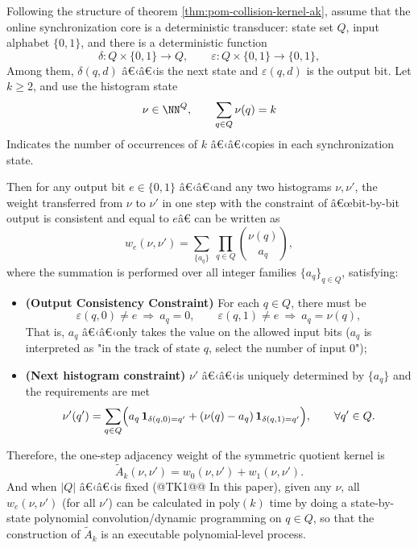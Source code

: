 \begin{proposition}\label{prop:pom-ak-symmetric-transition-poly}
Following the structure of theorem \ref{thm:pom-collision-kernel-ak}, assume that the online synchronization core is a deterministic transducer: state set $Q$, input alphabet $\{0,1\}$, and there is a deterministic function
$$
\delta:Q\times\{0,1\}\to Q,\qquad \varepsilon:Q\times\{0,1\}\to\{0,1\},
$$
Among them, $\delta(q,d)$ â€‹â€‹is the next state and $\varepsilon(q,d)$ is the output bit. Let $k\ge 2$, and use the histogram state
$$
\nu\in\NN^{Q},\qquad \sum_{q\in Q}\nu(q)=k
$$
Indicates the number of occurrences of $k$ â€‹â€‹copies in each synchronization state.

Then for any output bit $e\in\{0,1\}$ â€‹â€‹and any two histograms $\nu,\nu'$, the weight transferred from $\nu$ to $\nu'$ in one step with the constraint of â€œbit-by-bit output is consistent and equal to $e$â€ can be written as
$$
w_e(\nu,\nu')
=
\sum_{\{a_q\}}
\ \prod_{q\in Q}\binom{\nu(q)}{a_q},
$$
where the summation is performed over all integer families $\{a_q\}_{q\in Q}$, satisfying:
\begin{itemize}
  \item \textbf{(Output Consistency Constraint)} For each $q\in Q$, there must be
  $$
  \varepsilon(q,0)\neq e\ \Rightarrow\ a_q=0,\qquad
  \varepsilon(q,1)\neq e\ \Rightarrow\ a_q=\nu(q),
  $$
  That is, $a_q$ â€‹â€‹only takes the value on the allowed input bits ($a_q$ is interpreted as "in the track of state $q$, select the number of input $0$");
  \item \textbf{(Next histogram constraint)} $\nu'$ â€‹â€‹is uniquely determined by $\{a_q\}$ and the requirements are met
  $$
  \nu'(q')
  =
  \sum_{q\in Q}\Bigl(
  a_q\,\mathbf{1}_{\delta(q,0)=q'}+(\nu(q)-a_q)\,\mathbf{1}_{\delta(q,1)=q'}
  \Bigr),
  \qquad \forall q'\in Q.
  $$
\end{itemize}
Therefore, the one-step adjacency weight of the symmetric quotient kernel is
$$
\widetilde A_k(\nu,\nu')=w_0(\nu,\nu')+w_1(\nu,\nu').
$$
And when $|Q|$ â€‹â€‹is fixed (@TK1@@ In this paper), given any $\nu$, all $w_e(\nu,\nu')$ (for all $\nu'$) can be calculated in $\mathrm{poly}(k)$ time by doing a state-by-state polynomial convolution/dynamic programming on $q\in Q$, so that the construction of \(\widetilde A_k\) is an executable polynomial-level process.
\end{proposition}
